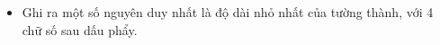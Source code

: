 \begin{itemize}
	\item Ghi ra một số nguyên duy nhất là độ dài nhỏ nhất của tường thành, với 4 chữ số sau dấu phẩy.
\end{itemize}